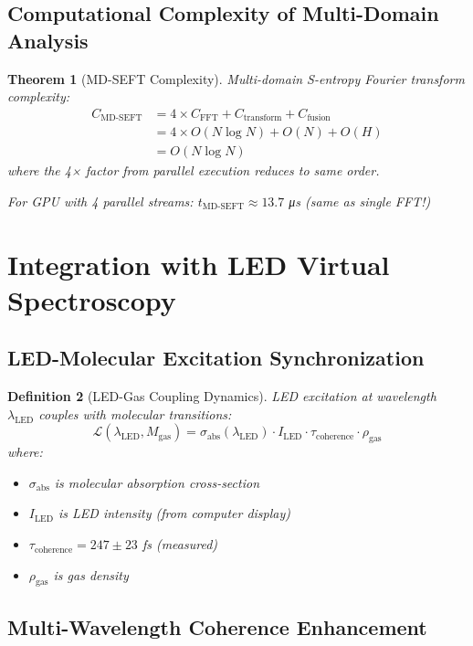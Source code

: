 \documentclass[12pt,a4paper]{article}
\newtheorem{theorem}{Theorem}[section]
\newtheorem{definition}[theorem]{Definition}
\begin{document}
\subsection{Computational Complexity of Multi-Domain Analysis}

\begin{theorem}[MD-SEFT Complexity]
Multi-domain S-entropy Fourier transform complexity:
\begin{align}
C_{\text{MD-SEFT}} &= 4 \times C_{\text{FFT}} + C_{\text{transform}} + C_{\text{fusion}} \\
&= 4 \times O(N \log N) + O(N) + O(H) \\
&= O(N \log N)
\end{align}
where the 4× factor from parallel execution reduces to same order.

For GPU with 4 parallel streams: $t_{\text{MD-SEFT}} \approx 13.7$ μs (same as single FFT!)
\end{theorem}

\section{Integration with LED Virtual Spectroscopy}

\subsection{LED-Molecular Excitation Synchronization}

\begin{definition}[LED-Gas Coupling Dynamics]
LED excitation at wavelength $\lambda_{\text{LED}}$ couples with molecular transitions:
\begin{equation}
\mathcal{L}(\lambda_{\text{LED}}, M_{\text{gas}}) = \sigma_{\text{abs}}(\lambda_{\text{LED}}) \cdot I_{\text{LED}} \cdot \tau_{\text{coherence}} \cdot \rho_{\text{gas}}
\end{equation}
where:
\begin{itemize}
\item $\sigma_{\text{abs}}$ is molecular absorption cross-section
\item $I_{\text{LED}}$ is LED intensity (from computer display)
\item $\tau_{\text{coherence}} = 247 \pm 23$ fs (measured)
\item $\rho_{\text{gas}}$ is gas density
\end{itemize}
\end{definition}

\subsection{Multi-Wavelength Coherence Enhancement}
\end{document}
